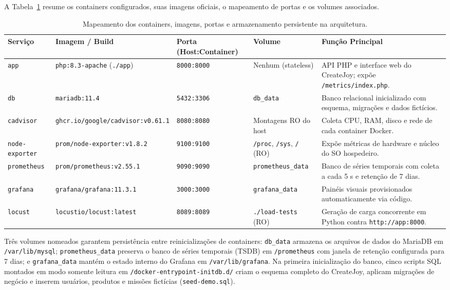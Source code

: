 \documentclass[conference]{IEEEtran}
\begin{document}
A Tabela~\ref{tab:servicos} resume os containers configurados, suas imagens oficiais, o mapeamento de portas e os volumes associados.

\begin{table}[t]
\centering
\caption{Mapeamento dos containers, imagens, portas e armazenamento persistente na arquitetura.}
\label{tab:servicos}
\begin{tabular}{@{}llllp{4.3cm}@{}}
\toprule
\textbf{Serviço} & \textbf{Imagem / Build} & \textbf{Porta (Host:Container)} & \textbf{Volume} & \textbf{Função Principal} \\
\midrule
\texttt{app} & \texttt{php:8.3-apache} (\texttt{./app}) & \texttt{8000:8000} & Nenhum (stateless) & API PHP e interface web do CreateJoy; expõe \texttt{/metrics/index.php}. \\
\texttt{db} & \texttt{mariadb:11.4} & \texttt{5432:3306} & \texttt{db\_data} & Banco relacional inicializado com esquema, migrações e dados fictícios. \\
\texttt{cadvisor} & \texttt{ghcr.io/google/cadvisor:v0.61.1} & \texttt{8080:8080} & Montagens RO do host & Coleta CPU, RAM, disco e rede de cada container Docker. \\
\texttt{node-exporter} & \texttt{prom/node-exporter:v1.8.2} & \texttt{9100:9100} & \texttt{/proc}, \texttt{/sys}, \texttt{/} (RO) & Expõe métricas de hardware e núcleo do SO hospedeiro. \\
\texttt{prometheus} & \texttt{prom/prometheus:v2.55.1} & \texttt{9090:9090} & \texttt{prometheus\_data} & Banco de séries temporais com coleta a cada 5 s e retenção de 7 dias. \\
\texttt{grafana} & \texttt{grafana/grafana:11.3.1} & \texttt{3000:3000} & \texttt{grafana\_data} & Painéis visuais provisionados automaticamente via código. \\
\texttt{locust} & \texttt{locustio/locust:latest} & \texttt{8089:8089} & \texttt{./load-tests} (RO) & Geração de carga concorrente em Python contra \texttt{http://app:8000}. \\
\bottomrule
\end{tabular}
\end{table}

Três volumes nomeados garantem persistência entre reinicializações de containers: \texttt{db\_data} armazena os arquivos de dados do MariaDB em \texttt{/var/lib/mysql}; \texttt{prometheus\_data} preserva o banco de séries temporais (TSDB) em \texttt{/prometheus} com janela de retenção configurada para 7 dias; e \texttt{grafana\_data} mantém o estado interno do Grafana em \texttt{/var/lib/grafana}. Na primeira inicialização do banco, cinco scripts SQL montados em modo somente leitura em \texttt{/docker-entrypoint-initdb.d/} criam o esquema completo do CreateJoy, aplicam migrações de negócio e inserem usuários, produtos e missões fictícias (\texttt{seed-demo.sql}).
\end{document}

